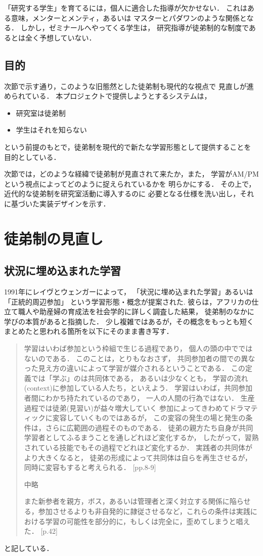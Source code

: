\documentclass[a4,p11]{article}
\begin{document}
「研究する学生」を育てるには，個人に適合した指導が欠かせない．
これはある意味，メンターとメンティ，あるいは
マスターとパダワンのような関係となる．
しかし，ゼミナールへやってくる学生は，
研究指導が徒弟制的な制度であるとは全く予想していない．

\subsection{目的}
\label{sec:orgcaccec1}
次節で示す通り，このような旧態然とした徒弟制も現代的な視点で
見直しが進められている．
本プロジェクトで提供しようとするシステムは，
\begin{itemize}
\item 研究室は徒弟制
\item 学生はそれを知らない
\end{itemize}
という前提のもとで，徒弟制を現代的で新たな学習形態として提供することを
目的としている．

次節では，どのような経緯で徒弟制が見直されて来たか，また，
学習がAM/PMという視点によってどのように捉えられているかを
明らかにする．
その上で，近代的な徒弟制を研究室活動に導入するのに
必要となる仕様を洗い出し，それに基づいた実装デザインを示す．

\section{徒弟制の見直し}
\label{sec:orgeafec21}
\subsection{状況に埋め込まれた学習}
\label{sec:orgaaa328b}
1991年にレイヴとウェンガーによって，
  「状況に埋め込まれた学習」あるいは「正統的周辺参加」
  という学習形態・概念が提案された\cite{LaveWenger}.
  彼らは，アフリカの仕立て職人や助産婦の育成法を社会学的に詳しく調査した結果，
  徒弟制のなかに学びの本質があると指摘した．
少し複雑ではあるが，その概念をもっとも短くまとめたと思われる箇所を以下にそのまま書き写す．
\begin{quote}
学習はいわば参加という枠組で生じる過程であり，
個人の頭の中でではないのである．
このことは，とりもなおさず，
共同参加者の間での異なった見え方の違いによって学習が媒介されるということである．
この定義では「学ぶ」のは共同体である，
あるいは少なくとも，
学習の流れ(context)に参加している人たち，といえよう．
学習はいわば，共同参加者間にわかち持たれているのであり，
一人の人間の行為ではない．
生産過程では徒弟(見習い)が益々増大していく
参加によってきわめてドラマティックに変容していくものではあるが，
この変容の発生の場と発生の条件は，さらに広範囲の過程そのものである．
徒弟の親方たち自身が共同学習者としてふるまうことを通しどれほど変化するか，
したがって，習熟されている技能でもその過程でどれほど変化するか．
実践者の共同体がより大きくなると，
徒弟の形成によって共同体は自らを再生させるが，
同時に変容もすると考えられる．
\cite{LaveWenger}[pp.8-9]

中略

また新参者を親方，ボス，あるいは管理者と深く対立する関係に陥らせる，参加させるよりも非自発的に隷従させるなど，これらの条件は実践における学習の可能性を部分的に，もしくは完全に，歪めてしまうと唱えた．
\cite{LaveWenger}[p.42]
\end{quote}
と記している．
\end{document}

